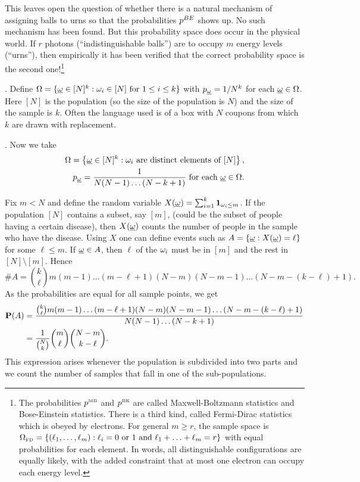 \documentclass[preprint,  11pt]{amsart}
\def\omeg{\underline{\ome}}
\begin{document}
\begin{example}
This leaves open the question of whether there is a natural mechanism of assigning balls to urns so that the probabilities $p^{\tiny BE}$ shows up. No such mechanism has been found. But this probability space does occur in the physical world. If $r$ photons (``indistinguishable balls'') are to occupy $m$ energy levels (``urns''), then empirically it has been verified that the correct probability space is the second one!\footnote{The probabilities $p^{\mb{\tiny MB}}$ and $p^{\mb{\tiny BE}}$ are called Maxwell-Boltzmann statistics and Bose-Einstein statistics. There is a third kind, called Fermi-Dirac statistics which is obeyed by electrons. For general $m\ge r$,  the sample space is $\Ome_{\mb{\tiny FD}}=\{(\ell_{1},\ldots ,\ell_{m})\suchthat \ell_{i}=0 \mb{ or }1 \mb{ and }\ell_{1}+\ldots +\ell_{m}=r\}$ with equal probabilities for each element. In words, all distinguishable configurations are equally likely, with the added constraint that at most one electron can occupy each energy level.}
\end{example}




\beg {}. Define $\Ome=\{\omeg\in [N]^{k}\suchthat \ome_{i}\in [N] \mb{ for }1\le i\le k\}$ with $p_{\omeg}=1/N^{k}$ for each $\omeg\in \Ome$. Here $[N]$ is the population (so the size of the population is $N$) and the size of the sample is $k$. Often the language used is of a box with $N$ coupons from which $k$ are drawn with replacement.
\eeg

\beg {}. Now we take 
\begin{align*}
\Ome=\l\{\omeg\in [N]^{k}\suchthat \ome_{i}\mb{ are distinct elements of } [N]\r\}, \\
p_{\omeg}=\frac{1}{N(N-1)\ldots (N-k+1)}  \mb{ for each }\omeg\in \Ome.
\end{align*}

Fix $m<N$ and define the random variable $X(\omeg)=\sum_{i=1}^{k}\one_{\ome_{i}\le m}$. If the population $[N]$ contains a subset, say $[m]$, (could be the subset of people having a certain disease), then $X(\omeg)$ counts the number of people in the sample who have the disease. Using $X$ one can define  events such as $A=\{\omeg\suchthat X(\omeg)=\ell\}$ for some $\ell\le m$. If $\omeg\in A$, then $\ell$ of the $\ome_{i}$ must be in $[m]$ and the rest in $[N]\setminus [m]$. Hence $$\#A=\binom{k}{\ell}m(m-1)\ldots (m-\ell+1)(N-m)(N-m-1)\ldots (N-m-(k-\ell)+1).$$
As the probabilities are equal for all sample points, we get
\begin{align*}
\P(A)&= \frac{\binom{k}{\ell}m(m-1)\ldots (m-\ell+1)(N-m)(N-m-1)\ldots (N-m-(k-\ell)+1)}{N(N-1)\ldots (N-k+1)} \\
 &= \frac{1}{\binom{N}{k}}\binom{m}{\ell}\binom{N-m}{k-\ell}.
\end{align*}
This expression arises whenever the population is subdivided into two parts and we count the number of samples that fall in one of the sub-populations.
\eeg
\end{document}
